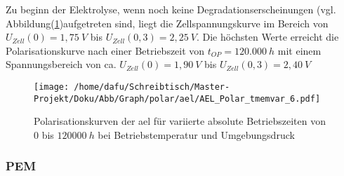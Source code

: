 \documentclass[onecolumn,10pt,titlepage]{article}
\begin{document}
Zu beginn der Elektrolyse, wenn noch keine Degradationserscheinungen (vgl. Abbildung(\ref{fig:polk_ael_tmemvar})aufgetreten sind, liegt die Zellspannungskurve im Bereich von  $U_{Zell}(0)=1,75~V$ bis $U_{Zell}(0,3)=2,25~V$. Die höchsten Werte erreicht die Polarisationskurve nach einer Betriebszeit von $t_{OP}=120.000~h$ mit einem Spannungsbereich von ca. $U_{Zell}(0)=1,90~V$ bis $U_{Zell}(0,3)=2,40~V$
\\

\begin{figure}[H]
	
	\centering
	\texttt{[image: /home/dafu/Schreibtisch/Master-Projekt/Doku/Abb/Graph/polar/ael/AEL\_Polar\_tmemvar\_6.pdf]}
	\caption[Polarisationskurven der \gls{ael} für variierte absolute Betriebszeiten]{Polarisationskurven der \gls{ael} für variierte absolute Betriebszeiten von $0$ bis $120000~h$ bei Betriebstemperatur und Umgebungsdruck}
	\label{fig:polk_ael_tmemvar} 
\end{figure}


\subsubsection*{PEM}
\end{document}
